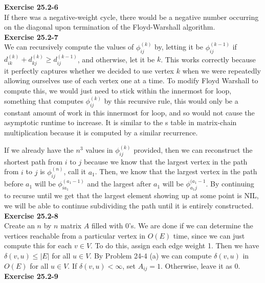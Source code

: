 \documentclass{article}
\begin{document}
\noindent\textbf{Exercise 25.2-6}\\

If there was a negative-weight cycle, there would be a negative number occurring on the diagonal upon termination of the Floyd-Warshall algorithm.  \\

\noindent\textbf{Exercise 25.2-7}\\
We can recursively compute the values of $\phi_{ij}^{(k)}$ by, letting it be $\phi_{ij}^{(k-1)}$ if $d_{ik}^{(k)} + d_{kj}^{(k)} \ge d_{ij}^{(k-1)}$, and otherwise, let it be $k$. This works correctly because it perfectly captures whether we decided to use vertex $k$ when we were repeatedly allowing ourselves use of each vertex one at a time. To modify Floyd Warshall to compute this, we would just need to stick within the innermost for loop, something that computes $\phi_{ij}^{(k)}$ by this recursive rule, this would only be a constant amount of work in this innermost for loop, and so would not cause the asymptotic runtime to increase. It is similar to the s table in matrix-chain multiplication because it is computed by a similar recurrence.

If we already have the $n^3$ values in $\phi_{ij}^{(k)}$ provided, then we can reconstruct the shortest path from $i$ to $j$ because we know that the largest vertex in the path from $i$ to $j$ is $\phi_{ij}^{(n)}$, call it $a_1$. Then, we know that the largest vertex in the path before $a_1$ will be $\phi_{ia_1}^{(a_1-1)}$ and the largest after $a_1$ will be $\phi_{a_1j}^{(a_1-1}$. By continuing to recurse until we get that the largest element showing up at some point is NIL, we will be able to continue subdividing the path until it is entirely constructed. \\

\noindent\textbf{Exercise 25.2-8}\\

Create an $n$ by $n$ matrix $A$ filled with 0's.  We are done if we can determine the vertices reachable from a particular vertex in $O(E)$ time, since we can just compute this for each $v \in V$. To do this, assign each edge weight 1.  Then we have $\delta(v,u) \leq |E|$ for all $u \in V$.  By Problem 24-4 (a) we can compute $\delta(v,u)$ in $O(E)$ for all $u \in V$.  If $\delta(v,u) < \infty$, set $A_{ij} = 1$.  Otherwise, leave it as 0.  \\

\noindent\textbf{Exercise 25.2-9}\\
\end{document}
